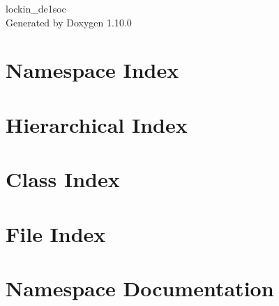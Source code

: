 \documentclass[twoside]{book}
\newcommand{\+}{\discretionary{\mbox{\scriptsize$\hookleftarrow$}}{}{}}
\newcommand{\clearemptydoublepage}{%
    \newpage{\pagestyle{empty}\cleardoublepage}%
  }
\begin{document}
  \raggedbottom
    \hypersetup{pageanchor=false,
                bookmarksnumbered=true,
                pdfencoding=unicode
               }
  \begin{titlepage}
  \vspace*{7cm}
  \begin{center}%
  {\Large lockin\+\_\+de1soc}\\
  \vspace*{1cm}
  {\large Generated by Doxygen 1.10.0}\\
  \end{center}
  \end{titlepage}
  \clearemptydoublepage
  \tableofcontents
  \clearemptydoublepage
  \hypersetup{pageanchor=true}



\chapter{Namespace Index}

\chapter{Hierarchical Index}

\chapter{Class Index}

\chapter{File Index}

\chapter{Namespace Documentation}
















\end{document}
